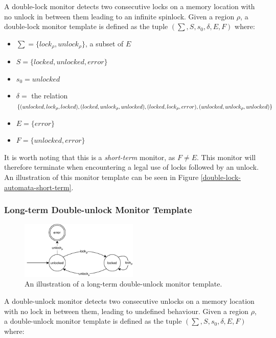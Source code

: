 A double-lock monitor detects two consecutive locks on a memory location with no unlock in between them leading to an infinite spinlock. Given a region $\rho$, a double-lock monitor template is defined as the tuple $(\sum, S, s_0, \delta, E, F)$ where: 

\begin{itemize}
    \item $\sum = \{lock_\rho, unlock_\rho\}$, a subset of $E$
    \item $S = \{ locked, unlocked, error \}$
    \item $s_0 = unlocked$ 
    \item $\delta =$ the relation $\{(unlocked, lock_\rho, locked), (locked, unlock_\rho, unlocked), \\
    (locked, lock_\rho, error), (unlocked, unlock_\rho, unlocked)\}$ 
    \item $E = \{ error \}$  
    \item $F = \{ unlocked, error \}$
\end{itemize}

\noindent It is worth noting that this is a \textit{short-term} monitor, as $F \neq E$. This monitor will therefore terminate when encountering a legal use of locks followed by an unlock. An illustration of this monitor template can be seen in Figure \ref{double-lock-automata-short-term}. 

\subsubsection*{Long-term Double-unlock Monitor Template}

\begin{figure}[H]
    \centering
    \includegraphics[width=0.5\textwidth]{algorithm/figures/double-unlock}
    \caption{An illustration of a long-term double-unlock monitor template.}
    \label{double-unlock-automata}
\end{figure}

A double-unlock monitor detects two consecutive unlocks on a memory location with no lock in between them, leading to undefined behaviour. Given a region $\rho$, a double-unlock monitor template is defined as the tuple $(\sum, S, s_0, \delta, E, F)$ where: 

